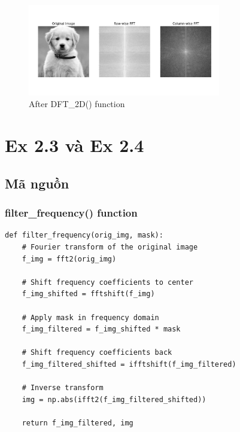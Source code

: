 \documentclass{article}
\begin{document}
\begin{figure}[H]
    \centering
    \includegraphics[width=0.75\textwidth]{ex212_output}
    \caption{After DFT\_2D() function}
    \label{ex212_output}
\end{figure}


\section{Ex 2.3 và Ex 2.4}
\subsection{Mã nguồn}
\subsubsection{filter\_frequency() function}
\begin{lstlisting}[caption={Code of filter\_frequency() function}, label={filter\_frequency()}]
def filter_frequency(orig_img, mask):
    # Fourier transform of the original image
    f_img = fft2(orig_img)

    # Shift frequency coefficients to center
    f_img_shifted = fftshift(f_img)

    # Apply mask in frequency domain
    f_img_filtered = f_img_shifted * mask

    # Shift frequency coefficients back
    f_img_filtered_shifted = ifftshift(f_img_filtered)

    # Inverse transform
    img = np.abs(ifft2(f_img_filtered_shifted))

    return f_img_filtered, img
\end{lstlisting}
\end{document}
